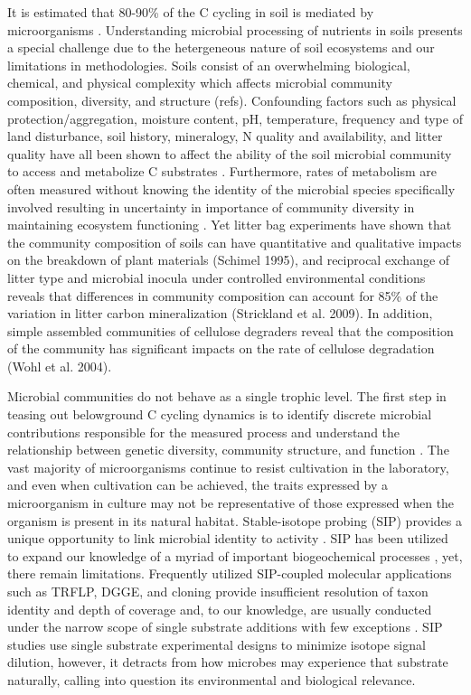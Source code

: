 It is estimated that 80-90\% of the C cycling in soil is mediated by microorganisms \cite{ColemanCrossley_1996,Nannipieri_2003}. Understanding microbial processing of nutrients in soils presents a special challenge due to the hetergeneous nature of soil ecosystems and our limitations in methodologies. Soils consist of an overwhelming biological, chemical, and physical complexity which affects microbial community composition, diversity, and structure (refs). Confounding factors such as physical protection/aggregation, moisture content, pH, temperature, frequency and type of land disturbance, soil history, mineralogy, N quality and availability, and litter quality have all been shown to affect the ability of the soil microbial community to access and metabolize C substrates \cite{Schlesinger_1977,dgett_Wall_Hattenschwiler_2010,Sollins_Homann_Caldwell_1996,Torn_Vitousek_Trumbore_2005,TRUMBORE_2006,Schimel_2012}. Furthermore, rates of metabolism are often measured without knowing the identity of the microbial species specifically involved \cite{ndi_Pietramellara_Renella_2003} resulting in uncertainty in importance of community diversity in maintaining ecosystem functioning \cite{Allison_2008,ndi_Pietramellara_Renella_2003,Schimel_2012}. Yet litter bag experiments have shown that the community composition of soils can have quantitative and qualitative impacts on the breakdown of plant materials (Schimel 1995), and reciprocal exchange of litter type and microbial inocula under controlled environmental conditions reveals that differences in community composition can account for 85\% of the variation in litter carbon mineralization (Strickland et al. 2009). In addition, simple assembled communities of cellulose degraders reveal that the composition of the community has significant impacts on the rate of cellulose degradation (Wohl et al. 2004). 


Microbial communities do not behave as a single trophic level. The first step in teasing out belowground C cycling dynamics is to identify discrete microbial contributions responsible for the measured process and understand the relationship between genetic diversity, community structure, and function \cite{O_Donnell_2002}. The vast majority of microorganisms continue to resist cultivation in the laboratory, and even when cultivation can be achieved, the traits expressed by a microorganism in culture may not be representative of those expressed when the organism is present in its natural habitat. Stable-isotope probing (SIP) provides a unique opportunity to link microbial identity to activity \cite{Chen_Murrell_2010}. SIP has been utilized to expand our knowledge of a myriad of important biogeochemical processes \cite{Chen_Murrell_2010}, yet, there remain limitations. Frequently utilized SIP-coupled molecular applications such as TRFLP, DGGE, and cloning provide insufficient resolution of taxon identity and depth of coverage and, to our knowledge, are usually conducted under the narrow scope of single substrate additions with few exceptions \cite{Lueders_2003,Chauhan_2009}. SIP studies use single substrate experimental designs to minimize isotope signal dilution, however, it detracts from how microbes may experience that substrate naturally, calling into question its environmental and biological relevance.

